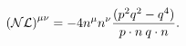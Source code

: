 \begin{equation}
{\cal (NL)}^{\mu\nu}=-4n^\mu n^\nu \frac{(p^2 q^2-q^4)}{p\cdot n\:q\cdot n}.
\end{equation}

